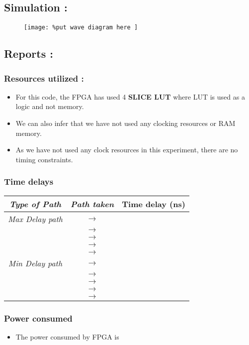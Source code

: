 \subsection*{Simulation :}
\begin{figure}[H]
    \centering
    \texttt{[image: 
		\%put wave diagram here
	]}
\end{figure}

\subsection*{Reports :}
\subsubsection*{Resources utilized : }
\begin{itemize}
    \item For this code, the FPGA has used 4 \textbf{SLICE LUT} where LUT is used as a logic and not memory.
    \item We can also infer that we have not used any clocking resources or RAM memory.
    \item As we have not used any clock resources in this experiment, there are no timing constraints.
\end{itemize}
\subsubsection*{Time delays}
\begin{center}
\begin{tabular}{|c|c|c|}\hline
\textit{Type of Path} & \textit{Path taken} & \textbf{Time delay (ns)}\\
\hline
\textit{Max Delay path} 
    & \textbf{} \(\rightarrow\) \textbf{} & \\\cline{2-3}
    & \textbf{} \(\rightarrow\) \textbf{}  & \\\cline{2-3}
    & \textbf{} \(\rightarrow\) \textbf{}  & \\\cline{2-3}
    & \textbf{} \(\rightarrow\) \textbf{}  & \\\cline{2-3}
    & \textbf{} \(\rightarrow\) \textbf{}  & \\\cline{2-3}
    \hline
\textit{Min Delay path}
    & \textbf{} \(\rightarrow\) \textbf{} & \\\cline{2-3}
    & \textbf{} \(\rightarrow\) \textbf{}  & \\\cline{2-3}
    & \textbf{} \(\rightarrow\) \textbf{}  & \\\cline{2-3}
    & \textbf{} \(\rightarrow\) \textbf{}  & \\\cline{2-3}
    & \textbf{} \(\rightarrow\) \textbf{}  & \\\cline{2-3}
    \hline
\end{tabular}
\end{center}
\subsubsection*{Power consumed}
\begin{itemize}
    \item The power consumed by FPGA is \textbf{}
\end{itemize}
